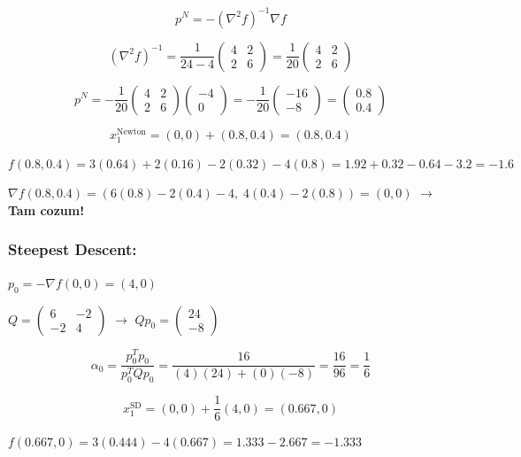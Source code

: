 \documentclass[12pt,a4paper]{article}
\theoremstyle{definition}
\theoremstyle{remark}
\begin{document}
\[
p^N = -(\nabla^2 f)^{-1} \nabla f
\]

\[
(\nabla^2 f)^{-1} = \frac{1}{24-4} \begin{pmatrix} 4 & 2 \\ 2 & 6 \end{pmatrix} = \frac{1}{20} \begin{pmatrix} 4 & 2 \\ 2 & 6 \end{pmatrix}
\]

\[
p^N = -\frac{1}{20} \begin{pmatrix} 4 & 2 \\ 2 & 6 \end{pmatrix} \begin{pmatrix} -4 \\ 0 \end{pmatrix} = -\frac{1}{20} \begin{pmatrix} -16 \\ -8 \end{pmatrix} = \begin{pmatrix} 0.8 \\ 0.4 \end{pmatrix}
\]

\[
x_1^{\text{Newton}} = (0,0) + (0.8, 0.4) = (0.8, 0.4)
\]

$f(0.8, 0.4) = 3(0.64) + 2(0.16) - 2(0.32) - 4(0.8) = 1.92 + 0.32 - 0.64 - 3.2 = \mathbf{-1.6}$

$\nabla f(0.8, 0.4) = (6(0.8) - 2(0.4) - 4,\; 4(0.4) - 2(0.8)) = (0, 0)$ $\rightarrow$ \textbf{Tam cozum!}

\subsubsection{Steepest Descent:}

$p_0 = -\nabla f(0,0) = (4, 0)$

$Q = \begin{pmatrix} 6 & -2 \\ -2 & 4 \end{pmatrix}$ $\rightarrow$ $Q p_0 = \begin{pmatrix} 24 \\ -8 \end{pmatrix}$

\[
\alpha_0 = \frac{p_0^T p_0}{p_0^T Q p_0} = \frac{16}{(4)(24) + (0)(-8)} = \frac{16}{96} = \frac{1}{6}
\]

\[
x_1^{\text{SD}} = (0,0) + \frac{1}{6}(4, 0) = (0.667, 0)
\]

$f(0.667, 0) = 3(0.444) - 4(0.667) = 1.333 - 2.667 = \mathbf{-1.333}$
\end{document}
